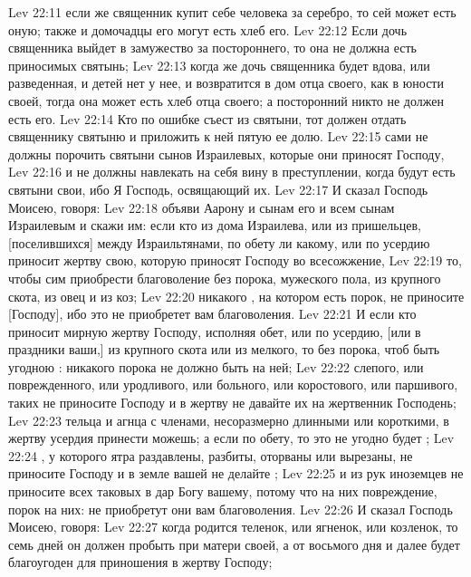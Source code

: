 \vs Lev 22:11 если же священник купит себе человека за серебро, то сей может есть оную; также и домочадцы его могут есть хлеб его.
\vs Lev 22:12 Если дочь священника выйдет в замужество за постороннего, то она не должна есть приносимых святынь;
\vs Lev 22:13 когда же дочь священника будет вдова, или разведенная, и детей нет у нее, и возвратится в дом отца своего, как  в юности своей, тогда она может есть хлеб отца своего; а посторонний никто не должен есть его.
\vs Lev 22:14 Кто по ошибке съест  из святыни, тот должен отдать священнику святыню и приложить к ней пятую ее долю.
\vs Lev 22:15  сами не должны порочить святыни сынов Израилевых, которые они приносят Господу,
\vs Lev 22:16 и не должны навлекать на себя вину в преступлении, когда будут есть святыни свои, ибо Я Господь, освящающий их.
\rsbpar\vs Lev 22:17 И сказал Господь Моисею, говоря:
\vs Lev 22:18 объяви Аарону и сынам его и всем сынам Израилевым и скажи им: если кто из дома Израилева, или из пришельцев, [поселившихся] между Израильтянами, по обету ли какому, или по усердию приносит жертву свою, которую приносят Господу во всесожжение,
\vs Lev 22:19 то, чтобы сим приобрести благоволение  без порока, мужеского пола, из крупного скота, из овец и из коз;
\vs Lev 22:20 никакого , на котором есть порок, не приносите [Господу], ибо это не приобретет вам благоволения.
\vs Lev 22:21 И если кто приносит мирную жертву Господу, исполняя обет, или по усердию, [или в праздники ваши,] из крупного скота или из мелкого, то  без порока, чтоб быть угодною : никакого порока не должно быть на ней;
\vs Lev 22:22  слепого, или поврежденного, или уродливого, или больного, или коростового, или паршивого, таких не приносите Господу и в жертву не давайте их на жертвенник Господень;
\vs Lev 22:23 тельца и агнца с членами, несоразмерно длинными или короткими, в жертву усердия принести можешь; а если по обету, то это не угодно будет ;
\vs Lev 22:24 , у которого ятра раздавлены, разбиты, оторваны или вырезаны, не приносите Господу и в земле вашей не делайте ;
\vs Lev 22:25 и из рук иноземцев не приносите всех таковых  в дар Богу вашему, потому что на них повреждение, порок на них: не приобретут они вам благоволения.
\rsbpar\vs Lev 22:26 И сказал Господь Моисею, говоря:
\vs Lev 22:27 когда родится теленок, или ягненок, или козленок, то семь дней он должен пробыть при матери своей, а от восьмого дня и далее будет благоугоден для приношения в жертву Господу;
